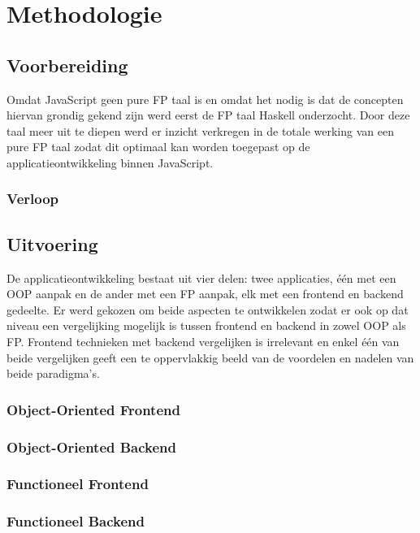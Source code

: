 
\chapter{Methodologie}
\label{ch:methodologie}


\section{Voorbereiding}
Omdat JavaScript geen pure FP taal is en omdat het nodig is dat de concepten hiervan grondig gekend zijn werd eerst de FP taal Haskell onderzocht. Door deze taal meer uit te diepen werd er inzicht verkregen in de totale werking van een pure FP taal zodat dit optimaal kan worden toegepast op de applicatieontwikkeling binnen JavaScript.

\subsection{Verloop}

\section{Uitvoering}
De applicatieontwikkeling bestaat uit vier delen: twee applicaties, één met een OOP aanpak en de ander met een FP aanpak, elk met een frontend en backend gedeelte. Er werd gekozen om beide aspecten te ontwikkelen zodat er ook op dat niveau een vergelijking mogelijk is tussen frontend en backend in zowel OOP als FP. Frontend technieken met backend vergelijken is irrelevant en enkel één van beide vergelijken geeft een te oppervlakkig beeld van de voordelen en nadelen van beide paradigma's.

\subsection{Object-Oriented Frontend}
\subsection{Object-Oriented Backend}
\subsection{Functioneel Frontend}
\subsection{Functioneel Backend}